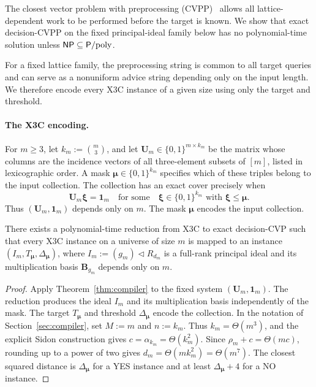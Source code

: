 The closest vector problem with preprocessing (CVPP)~\cite{Micciancio2001} allows all
lattice-dependent work to be performed before the target is known.
We show that exact decision-CVPP on the fixed principal-ideal
family below has no polynomial-time solution unless $\mathsf{NP}\subseteq\mathsf{P}/\mathrm{poly}$.

For a fixed lattice family, the preprocessing string is common to all target
queries and can serve as a nonuniform advice string depending
only on the input length.  We therefore encode every X3C
instance of a given size using only the target and threshold.

\paragraph{The X3C encoding.}
For $m\geq3$, let $k_m:=\binom m3$, and let
$\mathbf U_m\in\{0,1\}^{m\times k_m}$ be the matrix whose columns are the
incidence vectors of all three-element subsets of $[m]$,
listed in lexicographic order.  A mask
$\boldsymbol\mu\in\{0,1\}^{k_m}$ specifies which of these triples belong to
the input collection.  The collection has an exact cover precisely when
\[
 \mathbf U_m\boldsymbol\xi=\mathbf 1_m
 \quad\text{for some}\quad
 \boldsymbol\xi\in\{0,1\}^{k_m}
 \text{ with }\boldsymbol\xi\leq\boldsymbol\mu.
\]
Thus $(\mathbf U_m,\mathbf 1_m)$ depends only on $m$.  The mask
$\boldsymbol\mu$ encodes the input collection.

\begin{theorem}
\label{thm:fixed-family}
There exists a polynomial-time reduction from X3C to exact decision-CVP such
that every X3C instance on a universe of size $m$ is mapped to an instance
$(I_m,T_{\boldsymbol\mu},\Delta_{\boldsymbol\mu})$, where
\(I_m\mathrel{:=}(g_m)\lhd R_{d_m}\) is a full-rank principal ideal and
its multiplication basis \(\mathbf B_{g_m}\) depends only on \(m\).
\end{theorem}

\begin{proof}
Apply Theorem~\ref{thm:compiler} to the fixed system
$(\mathbf U_m,\mathbf 1_m)$.  The reduction produces the ideal
\(I_m\) and its multiplication basis independently of the mask.  The target
\(T_{\boldsymbol\mu}\) and threshold \(\Delta_{\boldsymbol\mu}\) encode the
collection.
In the notation of Section~\ref{sec:compiler}, set \(M:=m\)
and \(n:=k_m\).
Thus $k_m=\Theta(m^3)$, and the explicit Sidon construction gives
$c=\alpha_{k_m}=\Theta(k_m^2)$.  Since $\rho_m+c=\Theta(mc)$, rounding up
to a power of two gives
 $d_m=\Theta(mk_m^2)=\Theta(m^7)$.  The closest squared distance is
$\Delta_{\boldsymbol\mu}$ for a YES instance and at least
$\Delta_{\boldsymbol\mu}+4$ for a NO instance.
\end{proof}

